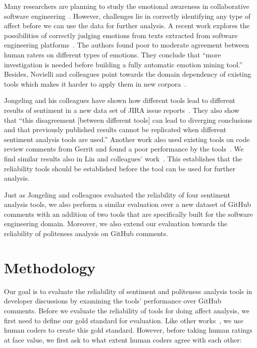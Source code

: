 Many researchers are planning to study 
the emotional awareness in collaborative software engineering~\cite{dewan2015towards}. 
However, challenges lie in correctly identifying any type of affect before we can use the data for further analysis. 
A recent work explores the possibilities of correctly judging emotions from texts extracted from software engineering platforms~\cite{murgia2014developers}. 
The authors found 
poor to moderate agreement between human raters 
on different types of emotions. 
They conclude that 
``more investigation is needed before 
building a fully automatic emotion mining tool.''
Besides, Novielli and colleagues point towards 
the domain dependency of existing tools 
which makes it harder to apply them in new corpora~\cite{novielli2015challenges}. 

Jongeling and his colleagues have shown 
how different tools lead to different results of sentiment 
in a new data set of JIRA issue reports~\cite{jongeling2017negative}. They also show that ``this disagreement [between different tools] 
can lead to diverging conclusions 
and that previously published results cannot be replicated 
when different sentiment analysis tools are used.'' 
Another work also used existing tools 
on code review comments from Gerrit 
and found a poor performance by the tools~\cite{ahmed2017senticr}. 
We find similar results also in Lin and colleagues' work~\cite{lin2018sentiment}.
This establishes that the reliability tools should be established
before the tool can be used for further analysis.

Just as Jongeling and colleagues 
evaluated the reliability of four sentiment analysis tools, 
we also perform a similar evaluation 
over a new dataset of GitHub comments 
with an addition of two tools 
that are specifically built for the software engineering domain. Moreover, we also extend our evaluation 
towards the reliability of politeness analysis 
on GitHub comments.  
   

\section{Methodology}

Our goal is to evaluate the reliability of sentiment and politeness analysis tools in developer discussions by examining the tools' performance over GitHub comments.
Before we evaluate the reliability of tools for doing affect analysis,
we first need to define our gold standard for evaluation.
Like other works~\cite{calefato2017sentiment,ahmed2017senticr}, we use human coders to create
this gold standard.
However, before taking human ratings at face value, we first ask
to what extent human coders agree with each other:

